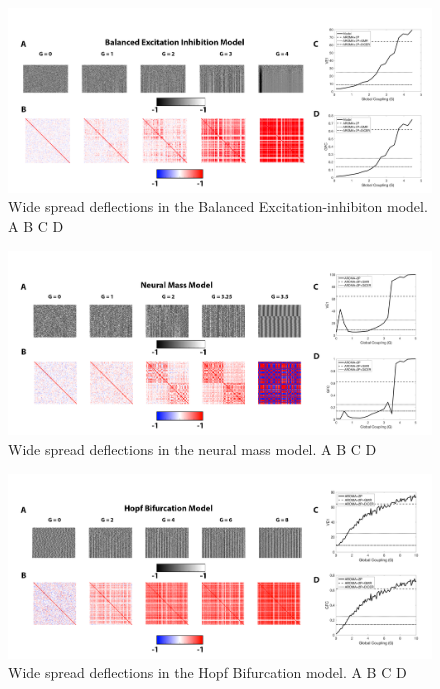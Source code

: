 \documentclass[oneside]{zHenriquesLab-StyleBioRxiv}
\begin{document}
\begin{figure}[ht!]
\includegraphics[width=1\textwidth]{figs/BEModel.png}
\caption{Wide spread deflections in the Balanced Excitation-inhibiton model. A B C D}\label{fig:BalancedEI_G}
\end{figure}

\begin{figure}[ht!]
\includegraphics[width=1\textwidth]{figs/BTFImage.png}
\caption{Wide spread deflections in the neural mass model. A B C D}\label{fig:NM_G}
\end{figure}

\begin{figure}[ht!]
\includegraphics[width=1\textwidth]{figs/HopfImage.png}
\caption{Wide spread deflections in the Hopf Bifurcation model. A B C D}\label{fig:Hopf_G}
\end{figure}
\end{document}
